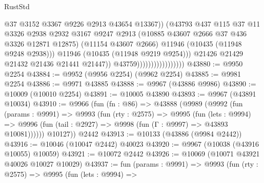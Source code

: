 \begin{lexlean}{RustStd}
\begin{coremodule}
                                                @37
                                                @3152
                                                @3367
                                                @9226
                                                @2913
                                                @43654
                                                @13367))
                                            (@43793
                                              @437
                                              @115
                                              @37
                                              @11
                                              @3326
                                              @2938
                                              @2932
                                              @3167
                                              @9247
                                              @2913
                                              (@10885 @43607 @2666 @37 @436 @3326 @12871 @12875)
                                              (@11154 @43607 @2666)
                                              @11946
                                              (@10435 (@11948 @9248 @2938)))
                                            @11946
                                            (@10435 (@11948 @9219 @9254)))
                                          @21426
                                          @21429
                                          @21432
                                          @21436
                                          @21441
                                          @21447))
                                      @43759)))))))))))))))))
@43880 := @9950 @2254
@43884 := @9952 (@9956 @2254) (@9962 @2254)
@43885 := @9981 @2254
@43886 := @9971 @43885
@43888 := @9967 (@43886 @9986)
@43890 := @10009 (@10010 @2254)
@43891 := @10005 @43890
@43893 := @9967 (@43891 @10034)
@43910 := @9966
    (fun (fn : @86) =>
    @43888
      (@9989
        (@9992
          (fun (params : @9991) =>
          @9993
            (fun (rty : @2575) =>
            @9995
              (fun (lets : @9994) =>
              @9996 (fun (tail : @2927) => @9998 (fun (Γ : @9997) => @43893 @10081))))))
        @10127))
    @2442
@43913 := @10133 (@43886 (@9984 @2442))
@43916 := @10046 (@10047 @2442) @40023
@43920 := @9967 (@10038 (@43916 @10055) @10059)
@43921 := @10072 @2442
@43926 := @10069 (@10071 @43921 @40026 @10027 @10029)
@43937 := fun (params : @9991) =>
  @9993
    (fun (rty : @2575) =>
    @9995
      (fun (lets : @9994) =>

\end{coremodule}
\end{lexlean}
